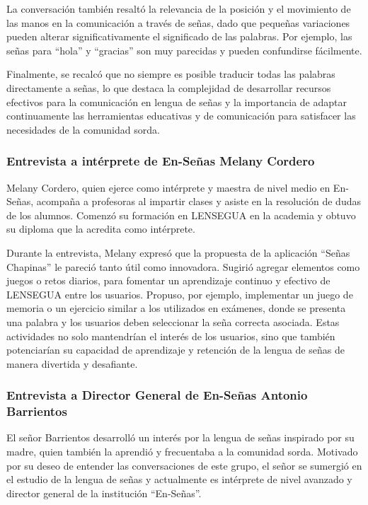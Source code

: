 La conversación también resaltó la relevancia de la posición y el movimiento de las manos en la comunicación a través de señas, dado que pequeñas variaciones pueden alterar significativamente el significado de las palabras. Por ejemplo, las señas para ``hola'' y ``gracias'' son muy parecidas y pueden confundirse fácilmente. 

Finalmente, se recalcó que no siempre es posible traducir todas las palabras directamente a señas, lo que destaca la complejidad de desarrollar recursos efectivos para la comunicación en lengua de señas y la importancia de adaptar continuamente las herramientas educativas y de comunicación para satisfacer las necesidades de la comunidad sorda.


\subsubsection{Entrevista a intérprete de En-Señas Melany Cordero}

Melany Cordero, quien ejerce como intérprete y maestra de nivel medio en En-Señas, acompaña a profesoras al impartir clases y asiste en la resolución de dudas de los alumnos. Comenzó su formación en LENSEGUA en la academia y obtuvo su diploma que la acredita como intérprete.

Durante la entrevista, Melany expresó que la propuesta de la aplicación ``Señas Chapinas'' le pareció tanto útil como innovadora. Sugirió agregar elementos como juegos o retos diarios, para fomentar un aprendizaje continuo y efectivo de LENSEGUA entre los usuarios. Propuso, por ejemplo, implementar un juego de memoria o un ejercicio similar a los utilizados en exámenes, donde se presenta una palabra y los usuarios deben seleccionar la seña correcta asociada. Estas actividades no solo mantendrían el interés de los usuarios, sino que también potenciarían su capacidad de aprendizaje y retención de la lengua de señas de manera divertida y desafiante.


\subsubsection{Entrevista a Director General de En-Señas Antonio Barrientos}

El señor Barrientos desarrolló un interés por la lengua de señas inspirado por su madre, quien también la aprendió y frecuentaba a la comunidad sorda. Motivado por su deseo de entender las conversaciones de este grupo, el señor se sumergió en el estudio de la lengua de señas y actualmente es intérprete de nivel avanzado y director general de la institución ``En-Señas''.

